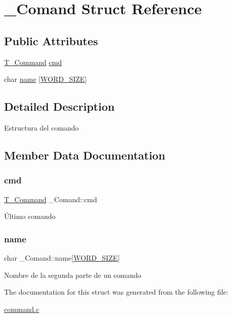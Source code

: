 \hypertarget{struct__Comand}{}\section{\+\_\+\+Comand Struct Reference}
\label{struct__Comand}
\subsection*{Public Attributes}
\begin{DoxyCompactItemize}
\item 
\hyperlink{command_8h_a0473597db8c45c0289b6b8e2f8abbe32}{T\+\_\+\+Command} \hyperlink{struct__Comand_adb4af509014e90c96221749aee7994a1}{cmd}
\item 
char \hyperlink{struct__Comand_a8618fa5519617b879057c2267cc1e0ff}{name} \mbox{[}\hyperlink{types_8h_a92ed8507d1cd2331ad09275c5c4c1c89}{W\+O\+R\+D\+\_\+\+S\+I\+ZE}\mbox{]}
\end{DoxyCompactItemize}


\subsection{Detailed Description}
Estructura del comando 

\subsection{Member Data Documentation}
\mbox{\label{struct__Comand_adb4af509014e90c96221749aee7994a1}} 
\subsubsection{\texorpdfstring{cmd}{cmd}}
{\footnotesize\ttfamily \hyperlink{command_8h_a0473597db8c45c0289b6b8e2f8abbe32}{T\+\_\+\+Command} \+\_\+\+Comand\+::cmd}

Último comando \mbox{\label{struct__Comand_a8618fa5519617b879057c2267cc1e0ff}} 
\subsubsection{\texorpdfstring{name}{name}}
{\footnotesize\ttfamily char \+\_\+\+Comand\+::name\mbox{[}\hyperlink{types_8h_a92ed8507d1cd2331ad09275c5c4c1c89}{W\+O\+R\+D\+\_\+\+S\+I\+ZE}\mbox{]}}

Nombre de la segunda parte de un comando 

The documentation for this struct was generated from the following file\+:\begin{DoxyCompactItemize}
\item 
\hyperlink{command_8c}{command.\+c}\end{DoxyCompactItemize}
